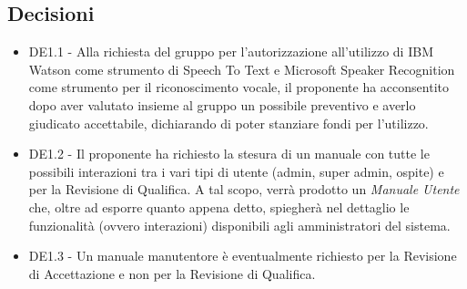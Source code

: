 \documentclass[a4paper,titlepage]{article}
\begin{document}
		\subsection{Decisioni}
		\begin{itemize}
			\item DE1.1 - Alla richiesta del gruppo per l'autorizzazione all'utilizzo di IBM Watson come strumento di Speech To Text e Microsoft Speaker Recognition come strumento per il riconoscimento vocale, il proponente \PROPONENTE{} ha acconsentito dopo aver valutato insieme al gruppo \GRUPPO{} un possibile preventivo e averlo giudicato accettabile, dichiarando di poter stanziare fondi per l'utilizzo.  
			\item DE1.2 - Il proponente ha richiesto la stesura di un manuale con tutte le possibili interazioni tra i vari tipi di utente (admin, super admin, ospite) e \PROGETTO{} per la Revisione di Qualifica. A tal scopo, verrà prodotto un \textit{Manuale Utente} che, oltre ad esporre quanto appena detto, spiegherà nel dettaglio le funzionalità (ovvero interazioni) disponibili agli amministratori del sistema.
			\item DE1.3 - Un manuale manutentore è eventualmente richiesto per la Revisione di Accettazione e non per la Revisione di Qualifica.
		\end{itemize}
		
		
	
\end{document}
